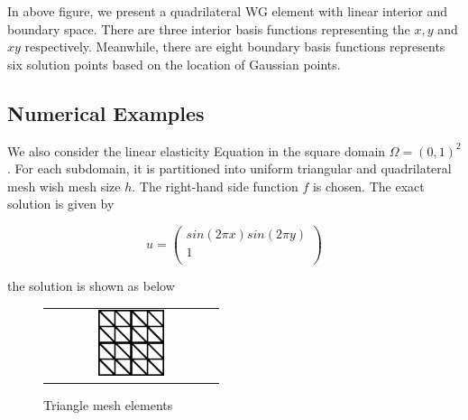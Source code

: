In above figure, we present a quadrilateral WG element with linear interior and boundary space. There are three interior basis functions representing the $ x, y $ and $ xy $ respectively. Meanwhile, there are eight boundary basis functions represents six solution points based on the location of Gaussian points.

\subsection{Numerical Examples}

We also consider the linear elasticity Equation in the square domain $ \Omega = (0, 1)^2 $. For each subdomain, it is partitioned into uniform triangular and quadrilateral mesh wish mesh size $ h $. The right-hand side function $ f $ is chosen. The exact solution is given by

\begin{equation}
u = \begin{pmatrix}
sin(2 \pi x) sin(2\pi y) \\ 1\\
\end{pmatrix}
\end{equation}

the solution is shown as below

\begin{figure}[H]
	\centering
	\begin{tabular}{c}
		\includegraphics[width=0.4\textwidth]{./pics/triangleMesh}
	\end{tabular}
	\caption{\footnotesize Triangle mesh elements}
\end{figure}

